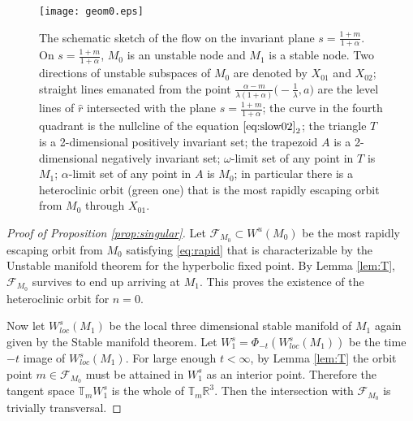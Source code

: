 \documentclass[a4paper,11pt]{article}
\theoremstyle{remark}
\begin{document}
\begin{figure}
 \centering
  \texttt{[image: geom0.eps]}
  \flushleft
  \caption{The schematic sketch of the flow on the invariant plane $s=\frac{1+m}{1+\alpha}$.   On $s=\frac{1+m}{1+\alpha}$, $M_0$ is an unstable node and $M_1$ is a stable node. Two directions of unstable subspaces of $M_0$ are denoted by $X_{01}$ and $X_{02}$; straight lines emanated from the point $\frac{\alpha-m}{\lambda(1+\alpha)}\big(-\frac{1}{\lambda},a\big)$ are the level lines of $\hat{r}$ intersected with the plane $s=\frac{1+m}{1+\alpha}$; the curve in the fourth quadrant is the nullcline of the equation $\eqref{eq:slow02}_2$; the triangle $T$ is a 2-dimensional positively invariant set; the trapezoid $A$ is a 2-dimensional negatively invariant set; $\omega$-limit set of any point in $T$ is $M_1$; $\alpha$-limit set of any point in $A$ is $M_0$; in particular there is a heteroclinic orbit (green one) that is the most rapidly escaping orbit from $M_0$ through $X_{01}$. } \label{fig:flow0}
\end{figure}


\begin{proof}[Proof of Proposition \ref{prop:singular}]
 Let $\mathcal{F}_{M_0}\subset W^u(M_0)$ be the most rapidly escaping orbit from $M_0$ satisfying \eqref{eq:rapid} that is characterizable by the Unstable manifold theorem for the hyperbolic fixed point. By Lemma \ref{lem:T}, $\mathcal{F}_{M_0}$ survives to end up arriving at $M_1$. This proves the existence of the heteroclinic orbit for $n=0$.

 Now let $W^s_{loc}(M_1)$ be the local three dimensional stable manifold of $M_1$ again given by the Stable manifold theorem. Let $W^s_1=\Phi_{-t}(W^s_{loc}(M_1))$ be the time $-t$ image of $W^s_{loc}(M_1)$. For large enough $t<\infty$, by Lemma \ref{lem:T} the orbit point $m\in \mathcal{F}_{M_0}$ must be attained in $W^s_1$ as an interior point. Therefore the tangent space $\mathbb{T}_m W^s_1$ is the whole of $\mathbb{T}_m \mathbb{R}^3$. Then the intersection with $\mathcal{F}_{M_0}$ is trivially transversal.
\end{proof}
\end{document}
